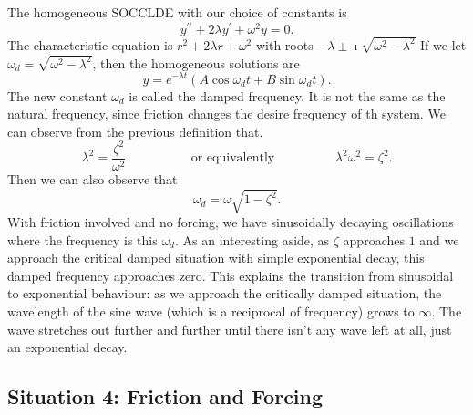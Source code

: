 \documentclass[fleqn,letterpaper]{report}
\begin{document}
The homogeneous SOCCLDE with our choice of constants is
\begin{equation*}
y^{\prime \prime} + 2\lambda y^\prime + \omega^2 y = 0.
\end{equation*}
The characteristic equation is $r^2 + 2\lambda r + \omega^2$
with roots $-\lambda \pm \imath \sqrt{\omega^2 - \lambda^2}$
If we let $\omega_d = \sqrt{\omega^2 - \lambda^2}$, then the
homogeneous solutions are
\begin{equation*}
y= e^{-\lambda t} (A \cos \omega_d t + B \sin \omega_d t).
\end{equation*}
The new constant $\omega_d$ is called the damped frequency.
It is not the same as the natural frequency, since friction
changes the desire frequency of th system. We can observe
from the previous definition that.
\begin{equation*}
\lambda^2 = \frac{\zeta^2}{\omega^2} \hspace{2cm} \text{ or
equivalently} \hspace{2cm} \lambda^2 \omega^2 = \zeta^2.
\end{equation*}
Then we can also observe that
\begin{equation*}
\omega_d = \omega \sqrt{1 - \zeta^2}.
\end{equation*}
With friction involved and no forcing, we have sinusoidally
decaying oscillations where the frequency is this $\omega_d$.
As an interesting aside, as $\zeta$ approaches $1$ and we
approach the critical damped situation with simple exponential
decay, this damped frequency approaches zero. This explains
the transition from sinusoidal to exponential behaviour: as we
approach the critically damped situation, the wavelength of the
sine wave (which is a reciprocal of frequency) grows to
$\infty$. The wave stretches out further and further until
there isn't any wave left at all, just an exponential decay. 

\subsection{Situation 4: Friction and Forcing}
\label{friction-forcing}
\end{document}
